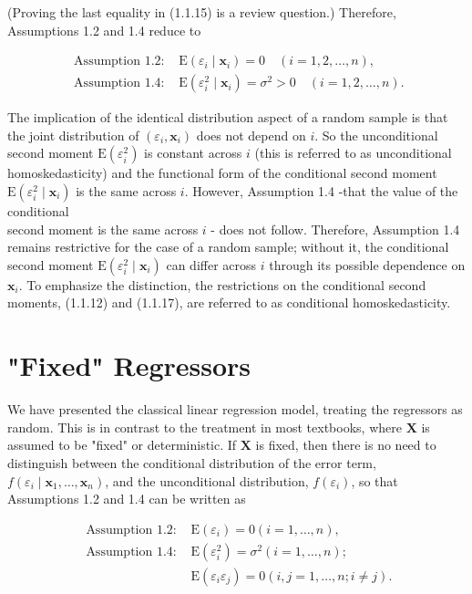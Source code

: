 \documentclass[10pt]{article}
\begin{document}
(Proving the last equality in (1.1.15) is a review question.) Therefore, Assumptions 1.2 and 1.4 reduce to

\[
\begin{array}{ll}
\text { Assumption 1.2: } & \mathrm{E}\left(\varepsilon_{i} \mid \mathbf{x}_{i}\right)=0 \quad(i=1,2, \ldots, n), \\
\text { Assumption 1.4: } & \mathrm{E}\left(\varepsilon_{i}^{2} \mid \mathbf{x}_{i}\right)=\sigma^{2}>0 \quad(i=1,2, \ldots, n) . \tag{1.1.17}
\end{array}
\]

The implication of the identical distribution aspect of a random sample is that the joint distribution of $\left(\varepsilon_{i}, \mathbf{x}_{i}\right)$ does not depend on $i$. So the unconditional second moment $\mathrm{E}\left(\varepsilon_{i}^{2}\right)$ is constant across $i$ (this is referred to as unconditional homoskedasticity) and the functional form of the conditional second moment $\mathrm{E}\left(\varepsilon_{i}^{2} \mid \mathbf{x}_{i}\right)$ is the same across $i$. However, Assumption 1.4 -that the value of the conditional\\
second moment is the same across $i$ - does not follow. Therefore, Assumption 1.4 remains restrictive for the case of a random sample; without it, the conditional second moment $\mathrm{E}\left(\varepsilon_{i}^{2} \mid \mathbf{x}_{i}\right)$ can differ across $i$ through its possible dependence on $\mathbf{x}_{i}$. To emphasize the distinction, the restrictions on the conditional second moments, (1.1.12) and (1.1.17), are referred to as conditional homoskedasticity.

\section*{"Fixed" Regressors}
We have presented the classical linear regression model, treating the regressors as random. This is in contrast to the treatment in most textbooks, where $\mathbf{X}$ is assumed to be "fixed" or deterministic. If $\mathbf{X}$ is fixed, then there is no need to distinguish between the conditional distribution of the error term, $f\left(\varepsilon_{i} \mid \mathbf{x}_{1}, \ldots, \mathbf{x}_{n}\right)$, and the unconditional distribution, $f\left(\varepsilon_{i}\right)$, so that Assumptions 1.2 and 1.4 can be written as

\[
\begin{array}{ll}
\text { Assumption 1.2: } & \mathrm{E}\left(\varepsilon_{i}\right)=0(i=1, \ldots, n), \\
\text { Assumption 1.4: } & \mathrm{E}\left(\varepsilon_{i}^{2}\right)=\sigma^{2}(i=1, \ldots, n) ; \\
& \mathrm{E}\left(\varepsilon_{i} \varepsilon_{j}\right)=0(i, j=1, \ldots, n ; i \neq j) . \tag{1.1.19}
\end{array}
\]
\end{document}

